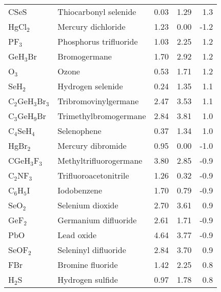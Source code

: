\begin{table}
\begin{center}
\begin{tabular}{llrrr}
 CSeS                 & Thiocarbonyl selenide                  &    0.03   &     1.29   &    1.3\\
 HgCl$_2$             & Mercury dichloride                     &    1.23   &     0.00   &   -1.2\\
 PF$_3$               & Phosphorus trifluoride                 &    1.03   &     2.25   &    1.2\\
 GeH$_3$Br            & Bromogermane                           &    1.70   &     2.92   &    1.2\\
 O$_3$                & Ozone                                  &    0.53   &     1.71   &    1.2\\
 SeH$_2$              & Hydrogen selenide                      &    0.24   &     1.35   &    1.1\\
 C$_2$GeH$_3$Br$_3$   & Tribromovinylgermane                   &    2.47   &     3.53   &    1.1\\
 C$_3$GeH$_9$Br       & Trimethylbromogermane                  &    2.84   &     3.81   &    1.0\\
 C$_4$SeH$_4$         & Selenophene                            &    0.37   &     1.34   &    1.0\\
 HgBr$_2$             & Mercury dibromide                      &    0.95   &     0.00   &   -1.0\\
 CGeH$_3$F$_3$        & Methyltrifluorogermane                 &    3.80   &     2.85   &   -0.9\\
 C$_2$NF$_3$          & Trifluoroacetonitrile                  &    1.26   &     0.32   &   -0.9\\
 C$_6$H$_5$I          & Iodobenzene                            &    1.70   &     0.79   &   -0.9\\
 SeO$_2$              & Selenium dioxide                       &    2.70   &     3.61   &    0.9\\
 GeF$_2$              & Germanium difluoride                   &    2.61   &     1.71   &   -0.9\\
 PbO                  & Lead oxide                             &    4.64   &     3.77   &   -0.9\\
 SeOF$_2$             & Seleninyl difluoride                   &    2.84   &     3.70   &    0.9\\
 FBr                  & Bromine fluoride                       &    1.42   &     2.25   &    0.8\\
 H$_2$S               & Hydrogen sulfide                       &    0.97   &     1.78   &    0.8\\

\end{tabular}
\end{center}
\end{table}
